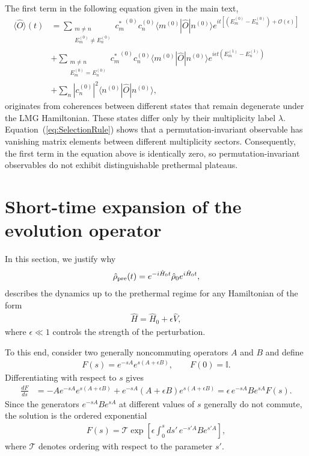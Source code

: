 \documentclass[aps,prl,amsfonts,floatfix,superscriptaddress,longbibliography,twocolumn,footinbib]{revtex4-2}
\begin{document}
The first term in the following equation given in the main text,
\begin{align}
    \langle \hat{O} \rangle (t) &= \!\! \!\! \sum_{\substack{m \neq n \\ E_m^{(0)} \neq E_n^{(0)}}} \!\!\!\! \! \!{c_m^*}^{(0)} c_n^{(0)} \langle m^{(0)}|\hat{O}|n^{(0)} \rangle e^{i t[(E_m^{(0)} - E_n^{(0)}) 
    + \mathcal{O}(\epsilon)]} \nonumber \\
    & + \!\!\!\! \sum_{\substack{m \neq n \\ E_m^{(0)} = E_n^{(0)}}} \!\! \!\! \! \! {c_m^*}^{(0)} c_n^{(0)} \langle m^{(0)}|\hat{O}|n^{(0)} \rangle e^{i\epsilon t(E_m^{(1)} - E_n^{(1)})} \nonumber \\
    & + \sum_n |c_n^{(0)}|^2\langle n^{(0)}|\hat{O}|n^{(0)} \rangle  ,
\end{align}
originates from coherences between different states that remain degenerate under the LMG Hamiltonian. These states differ only by their multiplicity label $\lambda$. Equation~(\ref{eq:SelectionRule}) shows that a permutation-invariant observable has vanishing matrix elements between different multiplicity sectors. Consequently, the first term in the equation above is identically zero, so permutation-invariant observables do not exhibit distinguishable prethermal plateaus.




\section{Short-time expansion of the evolution operator}
\label{app:expansion}

In this section, we justify why
\begin{align}
\hat\rho_{\rm pre}(t) = e^{-i\hat H_0t} \hat\rho_0 e^{i\hat H_0t},
\label{Eq:rhoPRE}
\end{align}
describes the dynamics up to the prethermal regime for any Hamiltonian of the form
%
\begin{align}
\hat H=\hat H_0+\epsilon \hat V,
\end{align}
%
where $\epsilon\ll1$ controls the strength of the perturbation.

To this end, consider two generally noncommuting operators $A$ and $B$ and define
%
\begin{align}
F(s)=e^{-sA}e^{s(A+\epsilon B)},
\qquad
F(0)=\mathbb I .
\end{align}
%
Differentiating with respect to $s$ gives
%
\begin{align}
\frac{dF}{ds}
&=
-Ae^{-sA}e^{s(A+\epsilon B)}
+e^{-sA}(A+\epsilon B)e^{s(A+\epsilon B)}
=
\epsilon\,e^{-sA}Be^{sA}F(s).
\end{align}
%
Since the generators
$e^{-sA}Be^{sA}$
at different values of $s$ generally do not commute, the solution is the ordered exponential
%
\begin{align}
F(s)
=
\mathcal T
\exp\!\left[
\epsilon
\int_0^s
ds'\,
e^{-s'A}
Be^{s'A}
\right],
\end{align}
%
where $\mathcal T$ denotes ordering with respect to the parameter $s'$.
\end{document}
